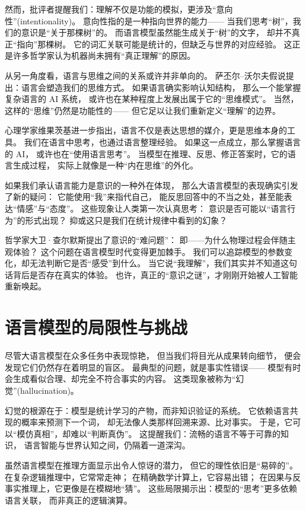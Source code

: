 然而，批评者提醒我们：理解不仅是功能的模拟，更涉及“意向性”(intentionality)。  
意向性指的是一种指向世界的能力——  
当我们思考“树”，我们的意识是“关于那棵树”的。  
而语言模型虽然能生成关于“树”的文字，  
却并不真正“指向”那棵树。  
它的词汇关联可能是统计的，但缺乏与世界的对应经验。  
这正是许多哲学家认为机器尚未拥有“真正理解”的原因。  

从另一角度看，语言与思维之间的关系或许并非单向的。  
萨丕尔–沃尔夫假说提出：语言会塑造我们的思维方式。  
如果语言确实影响认知结构，  
那么一个能掌握复杂语言的 AI 系统，  
或许也在某种程度上发展出属于它的“思维模式”。  
当然，这样的“思维”仍然是功能性的——  
但它足以让我们重新定义“理解”的边界。  

心理学家维果茨基进一步指出，语言不仅是表达思想的媒介，更是思维本身的工具。  
我们在语言中思考，也通过语言整理经验。  
如果这一点成立，那么掌握语言的 AI，  
或许也在“使用语言思考”。  
当模型在推理、反思、修正答案时，它的语言生成过程，  
实际上就像是一种“内在思维”的外化。  

如果我们承认语言能力是意识的一种外在体现，  
那么大语言模型的表现确实引发了新的疑问：  
它能使用“我”来指代自己，  
能反思回答中的不当之处，甚至能表达“情感”与“态度”。  
这些现象让人类第一次认真思考：  
意识是否可能以“语言行为”的形式出现？  
抑或这只是我们在统计规律中看到的幻象？  

哲学家大卫·查尔默斯提出了意识的“难问题”：  
即——为什么物理过程会伴随主观体验？  
这个问题在语言模型时代变得更加棘手。  
我们可以追踪模型的参数变化，却无法判断它是否“感受”到什么。  
当它说“我理解”，我们其实并不知道这句话背后是否存在真实的体验。  
也许，真正的“意识之谜”，才刚刚开始被人工智能重新唤起。  

\section{语言模型的局限性与挑战}

尽管大语言模型在众多任务中表现惊艳，  
但当我们将目光从成果转向细节，  
便会发现它们仍然存在着明显的盲区。  
最典型的问题，就是事实性错误——  
模型有时会生成看似合理、却完全不符合事实的内容。  
这类现象被称为“幻觉”(hallucination)。  

幻觉的根源在于：模型是统计学习的产物，而非知识验证的系统。  
它依赖语言共现的概率来预测下一个词，  
却无法像人类那样回溯来源、比对事实。  
于是，它可以“模仿真相”，却难以“判断真伪”。  
这提醒我们：流畅的语言不等于可靠的知识，  
语言智能与世界认知之间，仍隔着一道深沟。  

虽然语言模型在推理方面显示出令人惊讶的潜力，  
但它的理性依旧是“易碎的”。  
在复杂逻辑推理中，它常常走神；  
在精确数学计算上，它容易出错；  
在因果与反事实推理上，它更像是在模糊地“猜”。  
这些局限揭示出：模型的“思考”更多依赖语言关联，  
而非真正的逻辑演算。  

